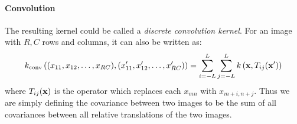 \paragraph{Convolution} The resulting kernel could be called a \emph{discrete convolution kernel}.  For an image with $R, C$ rows and columns, it can also be written as:
%
\begin{align}
k_{\textnormal{conv}} \left( (x_{11}, x_{12}, \dots, x_{RC} ), (x_{11}', x_{12}', \dots, x_{RC}' ) \right) = %
\sum_{i=-L}^L \sum_{j=-L}^L k\left( \vx, T_{ij}(\vx') \right)
\end{align}
%
where $T_{ij}({\bf{x}})$ is the operator which replaces each $x_{mn}$ with $x_{m+i, n+j}$.  Thus we are simply defining the covariance between two images to be the sum of all covariances between all relative translations of the two images.












